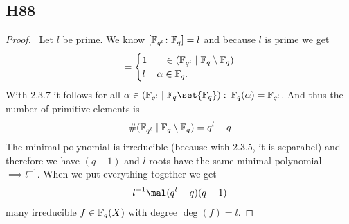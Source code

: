 \subsection{H88}
\begin{proof}\
	Let $l$ be prime.
	We know $[\mathbb{F}_{q^l}\colon \mathbb{F}_q] = l$ and because $l$ is prime we get 
	\begin{align*}
		[\F_q(\alpha)\colon \F] =
		\begin{cases}
			1 & \quad \in (\F_{q^l}\mid \F_q\setminus \F_q) \\
			l & \alpha \in \F_q.
		\end{cases}
	\end{align*}
	With 2.3.7 it follows for all $\alpha \in (\F_{q^l} \mid \F_q \set{\F_q}):$ $\mathbb{F}_q(\alpha) = \mathbb{F}_{q^l}$. And thus the number of primitive elements is 
	\begin{align*}
		\#(\mathbb{F}_{q^l} \mid \mathbb{F}_q \setminus \mathbb{F}_q) = q^l -q
	\end{align*}
	The minimal polynomial is irreducible (because with 2.3.5, it is separabel) and therefore we have $(q-1)$ and $l$ roots have the same minimal polynomial $\implies l^{-1}$. When we put everything together we get
	\begin{align*}
		l^{-1}\mal (q^l - q)(q-1)
	\end{align*}
	many irreducible $f \in \mathbb{F}_q(X)$ with degree $\deg(f) = l$.
\end{proof}